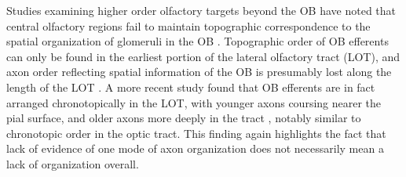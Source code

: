 Studies examining higher order olfactory targets beyond the OB have noted that central olfactory regions fail to maintain topographic correspondence to the spatial organization of glomeruli in the OB \cite{luskin1982distribution, sosulski2011distinct}. 
Topographic order of OB efferents can only be found in the earliest portion of the lateral olfactory tract (LOT), and axon order reflecting spatial information of the OB is presumably lost along the length of the LOT \cite{price1975observation}. 
A more recent study found that OB efferents are in fact arranged chronotopically in the LOT, with younger axons coursing nearer the pial surface, and older axons more deeply in the tract \cite{yamatani2004chronotopic}, notably similar to chronotopic order in the optic tract. 
This finding again highlights the fact that lack of evidence of one mode of axon organization does not necessarily mean a lack of organization overall.